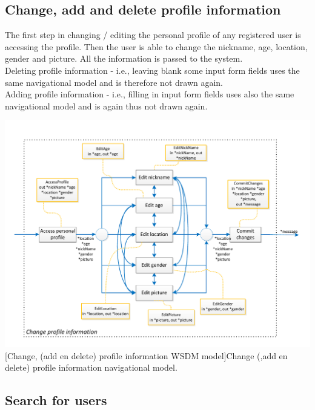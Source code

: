 \documentclass[11pt, a4paper,svglistings,oneside]{book}
\begin{document}
\clearpage

\subsection{Change, add and delete profile information}
\label{sec:changeadddelete}
The first step in changing / editing the personal profile of any registered user is accessing the profile. Then the user is able to change the nickname, age, location, gender and picture. All the information is passed to the system. \\
Deleting profile information - i.e., leaving blank some input form fields uses the same navigational model and is therefore not drawn again. \\
Adding profile information - i.e., filling in input form fields uses also the same navigational model and is again thus not drawn again.
$\;$ \\
\noindent\begin{minipage}{\textwidth}
    \centering
   \includegraphics[scale=0.85]{Nav_ChangeProfileInformation.pdf}
 [Change, (add en delete) profile information WSDM model]{Change (,add en delete) profile information navigational model.}
\end{minipage}

\subsection{Search for users}
\end{document}
